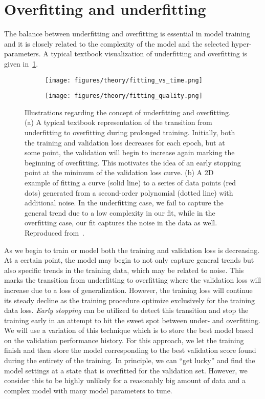 \section{Overfitting and underfitting}\label{sec:under_over_fit}
The balance between underfitting and overfitting is essential in model training
and it is closely related to the complexity of the model and the selected
hyper-parameters. A typical textbook visualization of underfitting and
overfitting is given in~\cref{fig:fitting_vs_time}. 


\begin{figure}[!htb]
  \centering
  \begin{subfigure}[t]{0.42\textwidth}
    \centering
    \texttt{[image: figures/theory/fitting\_vs\_time.png]}
    \caption{}
    \label{fig:fitting_vs_time}
  \end{subfigure}
  \hfill
  \begin{subfigure}[t]{0.57\textwidth}
    \centering
    \texttt{[image: figures/theory/fitting\_quality.png]}
    \caption{}
    \label{fig:fitting_quality}
  \end{subfigure}
  \hfill
  \caption{Illustrations regarding the concept of underfitting and overfitting. (a) A typical textbook representation of the transition from underfitting to overfitting during prolonged training. Initially, both the training and validation loss decreases for each epoch, but at some point, the validation will begin to increase again marking the beginning of overfitting. This motivates the idea of an early stopping point at the minimum of the validation loss curve. (b) A 2D example of fitting a curve (solid line) to a series of data points (red dots) generated from a second-order polynomial (dotted line) with additional noise. In the underfitting case, we fail to capture the general trend due to a low complexity in our fit, while in the overfitting case, our fit captures the noise in the data as well. Reproduced from~\cite{kaggle}.}
  \label{fig:over_under_fitting}
\end{figure}

As we begin to train or model both the training and validation loss is
decreasing. At a certain point, the model may begin to not only capture general
trends but also specific trends in the training data, which may be related to
noise. This marks the transition from underfitting to overfitting where the
validation loss will increase due to a loss of generalization. However, the
training loss will continue its steady decline as the training procedure
optimize exclusively for the training data loss. \textit{Early stopping} can be
utilized to detect this transition and stop the training early in an attempt to
hit the sweet spot between under- and overfitting. We will use a variation of
this technique which is to store the best model based on the validation
performance history. For this approach, we let the training finish and then
store the model corresponding to the best validation score found during the
entirety of the training. In principle, we can ``get lucky'' and find the model
settings at a state that is overfitted for the validation set. However, we
consider this to be highly unlikely for a reasonably big amount of data and a
complex model with many model parameters to tune.



